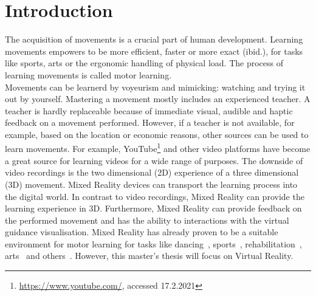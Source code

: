 \chapter{Introduction}
The acquisition of movements is a crucial part of human development\cite{mlbook}. Learning movements empowers to be more efficient, faster or more exact (ibid.), for tasks like sports, arts or the ergonomic handling of physical load. The process of learning movements is called motor learning.\\
Movements can be learnerd by voyeurism and mimicking: watching and trying it out by yourself. Mastering a movement mostly includes an experienced teacher. A teacher is hardly replaceable because of immediate visual, audible and haptic feedback on a movement performed. However, if a teacher is not available, for example, based on the location or economic reasons, other sources can be used to learn movements. For example, YouTube\footnote{\href{https://www.youtube.com/}{https://www.youtube.com/}, accessed 17.2.2021} and other video platforms have become a great source for learning videos for a wide range of purposes. The downside of video recordings is the two dimensional (2D) experience of a three dimensional (3D) movement. Mixed Reality devices can transport the learning process into the digital world. In contrast to video recordings, Mixed Reality can provide the learning experience in 3D. Furthermore, Mixed Reality can provide feedback on the performed movement and has the ability to interactions with the virtual guidance visualisation. Mixed Reality has already proven to be a suitable environment for motor learning for tasks like dancing~\cite{YouMove,vrdancetrainer,outsideme,performancetraining,mrdancetrainer}, sports~\cite{freethrowsimulator,trainingphysicalskills}, rehabilitation~\cite{motionma,physioathome,kinohaptics,sleevear,veimprovesml}, arts~\cite{ararm,justfollowme,stylo,elearningma,mythaichicoaches,rtgesturerecognistion,onebody,thaichichua} and others~\cite{tikl,lightguide}. However, this master's thesis will focus on Virtual Reality.\\
